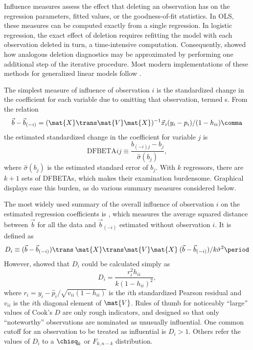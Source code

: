\documentclass[11pt]{book}
\begin{document}
Influence measures assess the effect that deleting an
observation has on the regression parameters, fitted values, or the
goodness-of-fit statistics.  In OLS, these measures
can be computed exactly from a single regression.
In logistic regression, the exact effect of deletion
requires refitting the model with each observation deleted in turn,
a time-intensive computation.
Consequently, \citet{Pregibon:81} showed how analogous deletion
diagnostics may be approximated by performing one additional step
of the iterative procedure.  Most modern implementations of these
methods for generalized linear models follow \citet{Williams:87}.

The simplest measure of influence of observation $i$ is the standardized change in the coefficient for each variable due to omitting that observation,
termed s.  From the relation \citep[p. 716]{Pregibon:81}
\begin{equation*}%
 \vec{b} -  \vec{b}_{(-i)} = (\mat{X}\trans \mat{V} \mat{X})^{-1} \vec{x}_i (y_i - p_i) / (1 - h_{ii})
 \comma
\end{equation*}
the estimated standardized change in the coefficient for variable $j$ is
\begin{equation}\label{eq:dfbeta}
 \mbox{DFBETA}{ij} \equiv \frac{b_{(-i)j} -  b_j } {\hat{\sigma} (b_j)}
 \comma
\end{equation}
where $\hat{\sigma} (b_j)$ is the estimated standard error of $b_j$.
With $k$ regressors, there are $k+1$ sets of DFBETAs, which makes their examination burdensome.
Graphical displays ease this burden, as do various summary measures
considered below.

The most widely used summary of the
overall influence of observation $i$ on the estimated regression
coefficients is , which measures
the average squared distance between $\vec{b}$ for all the data and
$\vec{b}_{(-i)}$ estimated without observation $i$.
It is defined as 
\begin{equation*}%
D_i \equiv ( \vec{b} - \vec{b}_{(-i)} )\trans \:
    \mat{X}\trans \mat{V} \mat{X} \:
     ( \vec{b} - \vec{b}_{(-i)} ) / k \hat{\sigma}^2
    \period
\end{equation*}
However, \citet{Pregibon:81} showed that $D_i$ could be calculated
simply as
\begin{equation}\label{eq:cookd2}
 D_i = \frac{r_i^2 h_{ii}} {k (1-h_{ii} )^2}
 \comma
\end{equation}
where $r_i = y_i - \hat{p}_i / \sqrt{v_{ii} (1-h_{ii})}$ is the
$i$th standardized Pearson residual and $v_{ii}$ is the
$i$th diagonal element of $\mat{V}$.
Rules of thumb for noticeably ``large'' values of Cook's $D$ 
are only rough indicators, and designed so that only
``noteworthy'' observations are nominated as unusually influential.
One common cutoff for an observation to be treated as influential
is $D_i > 1$. Others refer the values of $D_i$ to a 
$\chisq_k$ or $F_{k, n-k}$ distribution.
\end{document}
